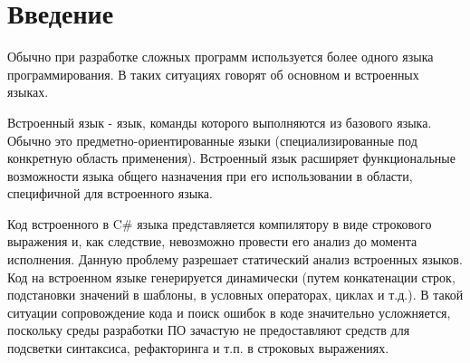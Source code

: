 \documentclass{matmex-diploma-custom}
\begin{document}
\maketitle
\tableofcontents
\section*{Введение}

Обычно при разработке сложных программ используется более одного языка программирования. В таких ситуациях говорят об основном и встроенных языках.

Встроенный язык - язык, команды которого выполняются из базового языка. Обычно это предметно-ориентированные языки (специализированные под конкретную область применения). Встроенный язык расширяет функциональные возможности языка общего назначения при его использовании в области, специфичной для встроенного языка.

Код встроенного в C\# языка представляется компилятору в виде строкового выражения и, как следствие, невозможно провести его анализ до момента исполнения. Данную проблему разрешает статический анализ встроенных языков.
Код на встроенном языке генерируется динамически (путем конкатенации строк, подстановки значений в шаблоны, в условных операторах, циклах и т.д.). В такой ситуации сопровождение кода и поиск ошибок в коде значительно усложняется, поскольку среды разработки ПО зачастую не предоставляют средств для подсветки синтаксиса, рефакторинга и т.п. в строковых выражениях.
\end{document}
